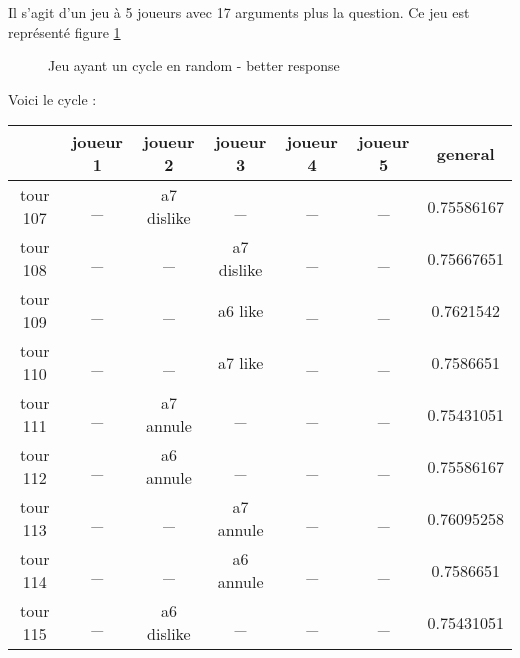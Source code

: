 \documentclass[12pt]{article}
\theoremstyle{defi}
\theoremstyle{not}
\theoremstyle{prob}
\begin{document}
        Il s'agit d'un jeu à 5 joueurs avec 17 arguments plus la question. Ce jeu est représenté figure \ref{fig:cycle_r_r_r}

        \begin{figure}
          \centering
          \caption{Jeu ayant un cycle en random - better response}
          \label{fig:cycle_r_r_r}
        \end{figure}

        Voici le cycle :

        \begin{tabular}{|c|c|c|c|c|c|c|}
          \hline
          & joueur 1 & joueur 2 & joueur 3 & joueur 4 & joueur 5 & general \\
          \hline
          tour 107 & \_ & a7 dislike & \_ & \_ & \_ & 0.75586167 \\
          \hline
          tour 108 & \_ & \_ & a7 dislike & \_ & \_ & 0.75667651 \\
          \hline
          tour 109 & \_ & \_ & a6 like & \_ & \_ & 0.7621542 \\
          \hline
          tour 110 & \_ & \_ & a7 like & \_ & \_ & 0.7586651 \\
          \hline
          tour 111 & \_ & a7 annule & \_ & \_ & \_ & 0.75431051 \\
          \hline
          tour 112 & \_ & a6 annule & \_ & \_ & \_ & 0.75586167 \\
          \hline
          tour 113 & \_ & \_ & a7 annule & \_ & \_ & 0.76095258 \\
          \hline
          tour 114 & \_ & \_ & a6 annule & \_ & \_ & 0.7586651 \\
          \hline
          tour 115 & \_ & a6 dislike & \_ & \_ & \_ & 0.75431051 \\
          \hline
        \end{tabular}
\end{document}

